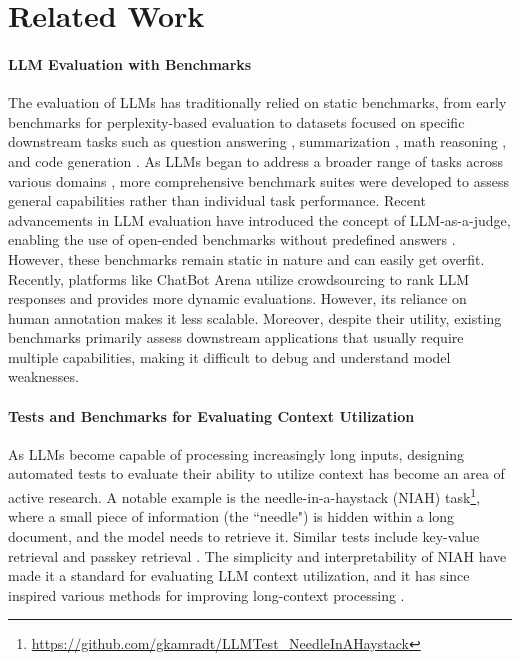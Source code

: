 \section{Related Work}


\paragraph{LLM Evaluation with Benchmarks} The evaluation of LLMs has traditionally relied on static benchmarks, from early benchmarks for perplexity-based  evaluation \cite{marcus-etal-1993-building} to datasets focused on specific downstream tasks such as question answering \cite{kwiatkowski2019natural}, summarization \cite{ Gliwa_2019}, math reasoning \cite{cobbe2021gsm8k}, and code generation \cite{chen2021codex}. As LLMs began to address a broader range of tasks across various domains \cite{wu2023autogenenablingnextgenllm, wang2023voyager}, more comprehensive benchmark suites \cite{hendrycks2021measuring, zhong2023agieval} were developed to assess general capabilities rather than individual task performance. Recent advancements in LLM evaluation have introduced the concept of LLM-as-a-judge, enabling the use of open-ended benchmarks without predefined answers \cite{zheng2023judging}. However, these benchmarks remain static in nature and can easily get overfit. Recently, platforms like ChatBot Arena \cite{zheng2023judging} utilize crowdsourcing to rank LLM responses and provides more dynamic evaluations. However, its reliance on human annotation makes it less scalable. Moreover, despite their utility, existing benchmarks primarily assess downstream applications that usually require multiple capabilities, making it difficult to debug and understand model weaknesses.


\paragraph{Tests and Benchmarks for Evaluating Context Utilization} As LLMs become capable of processing increasingly long inputs, designing automated tests to evaluate their ability to utilize context has become an area of active research.  A notable example is the needle-in-a-haystack (NIAH) task\footnote{\url{https://github.com/gkamradt/LLMTest_NeedleInAHaystack}}, where a small piece of information (the ``needle") is hidden within a long document, and the model needs to retrieve it. Similar tests include key-value retrieval \cite{liu-etal-2024-lost} and passkey retrieval \cite{mohtashami2023randomaccess}. The simplicity and interpretability of NIAH have made it a standard for evaluating LLM context utilization, and it has since inspired various methods for improving long-context processing \cite{mohtashami2023randomaccess, ding2024longrope, xiong2023effectivelongcontext, behrouz2024titans}.

